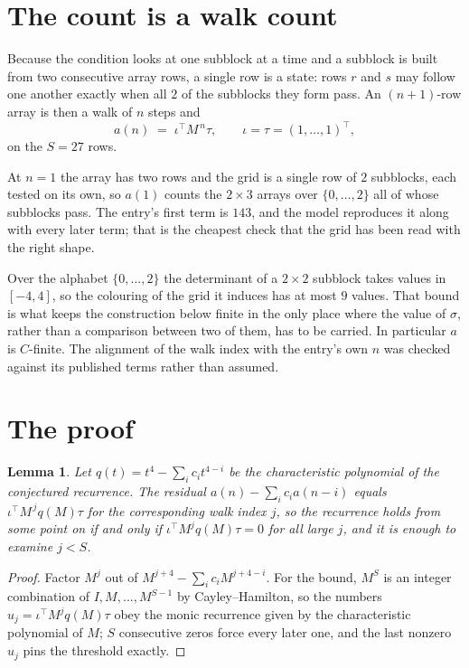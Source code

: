 \documentclass[11pt,a4paper]{article}
\theoremstyle{plain}
\newtheorem{lemma}[theorem]{Lemma}
\theoremstyle{definition}
\begin{document}
\section{The count is a walk count}

Because the condition looks at one subblock at a time and a subblock is
built from two consecutive array rows, a single row is a state: rows $r$ and $s$ may follow one
another exactly when all $2$ of the subblocks they form pass. An $(n+1)$-row array is then a
walk of $n$ steps and
\[
a(n)\;=\;\iota^{\!\top}M^{\,n}\tau,\qquad\iota=\tau=(1,\dots,1)^{\!\top},
\]
on the $S=27$ rows.

At $n=1$ the array has two rows and the grid is a single row of $2$
subblocks, each tested on its own, so $a(1)$ counts the
$2\times3$ arrays over $\{0,\dots,2\}$ all of whose subblocks pass. The entry's
first term is $143$, and the model reproduces it along with every later term; that is the
cheapest check that the grid has been read with the right shape.

Over the alphabet $\{0,\dots,2\}$ the determinant of a $2\times2$ subblock takes values in
$[-4,4]$, so the colouring of the grid it induces has at most $9$ values.
That bound is what keeps the construction below finite in the only place where the value of
$\sigma$, rather than a comparison between two of them, has to be carried.
In particular $a$ is $C$-finite. The alignment of the walk index with the entry's own $n$ was
checked against its published terms rather than assumed.

\section{The proof}

\begin{lemma}\label{lem:crit}
Let $q(t)=t^{4}-\sum_i c_it^{4-i}$ be the characteristic polynomial of the
conjectured recurrence. The residual $a(n)-\sum_ic_ia(n-i)$ equals
$\iota^{\!\top}M^{\,j}q(M)\tau$ for the corresponding walk index $j$, so the recurrence
holds from some point on if and only if $\iota^{\!\top}M^{j}q(M)\tau=0$ for all large $j$,
and it is enough to examine $j<S$.
\end{lemma}

\begin{proof}
Factor $M^{j}$ out of $M^{j+4}-\sum_ic_iM^{j+4-i}$. For the bound, $M^{S}$
is an integer combination of $I,M,\dots,M^{S-1}$ by Cayley--Hamilton, so the numbers
$u_j=\iota^{\!\top}M^{j}q(M)\tau$ obey the monic recurrence given by the characteristic
polynomial of $M$; $S$ consecutive zeros force every later one, and the last nonzero $u_j$
pins the threshold exactly.
\end{proof}
\end{document}
